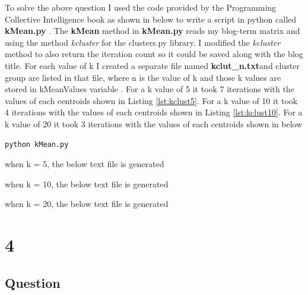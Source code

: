 \documentclass[letterpaper,11pt]{article}
\begin{document}
To solve the above question I  used the code provided by the Programming Collective Intelligence book as shown in below to write a script in python  called \textbf{kMean.py} \cite{collectiveIntell}. The \textbf{kMean} method in \textbf{kMean.py} reads my blog-term matrix and using the method \textit{kcluster} for the clusters.py library. I modified the \textit{kcluster} method to also return the iteration count so it could be saved along with the blog title. For each value of k I created a separate file named \textbf{kclut\_n.txt}and cluster group are listed in that file,  where n is the value of k and those k values are stored in kMeanValues variable . For a k value of 5 it took 7 iterations with the values of each centroids shown in Listing \ref{lst:kclust5}. For a k value of 10 it took 4  iterations with the values of each centroids shown in Listing \ref{lst:kclust10}. For a k value of 20 it took 3 iterations with the values of each centroids shown in below
\begin{lstlisting}[frame=single]
python kMean.py
\end{lstlisting}
 
when k = 5, the below text file is generated
 
when k = 10, the below text file is generated
 
when k = 20, the below text file is generated
 

\clearpage


\section*{4}

\subsection*{Question}
\end{document}
